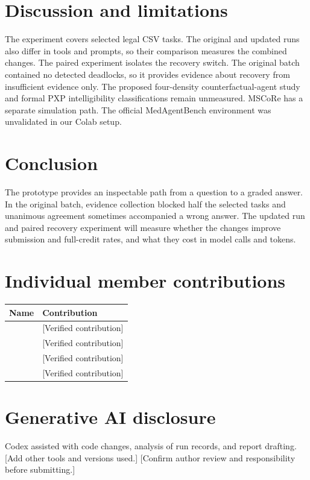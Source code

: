 \documentclass[11pt,a4paper,twocolumn]{article}
\begin{document}
\section{Discussion and limitations}
The experiment covers selected legal CSV tasks. The original and updated runs also differ in tools and prompts, so their comparison measures the combined changes. The paired experiment isolates the recovery switch. The original batch contained no detected deadlocks, so it provides evidence about recovery from insufficient evidence only. The proposed four-density counterfactual-agent study and formal PXP intelligibility classifications remain unmeasured. MSCoRe has a separate simulation path. The official MedAgentBench environment was unvalidated in our Colab setup.

\section{Conclusion}
The prototype provides an inspectable path from a question to a graded answer. In the original batch, evidence collection blocked half the selected tasks and unanimous agreement sometimes accompanied a wrong answer. The updated run and paired recovery experiment will measure whether the changes improve submission and full-credit rates, and what they cost in model calls and tokens.

\section*{Individual member contributions}
{\small
\begin{tabularx}{\linewidth}{@{}l X@{}}
\toprule
Name & Contribution \\
\midrule
[MEMBER 1] & [Verified contribution] \\
[MEMBER 2] & [Verified contribution] \\
[MEMBER 3] & [Verified contribution] \\
[MEMBER 4] & [Verified contribution] \\
\bottomrule
\end{tabularx}}

\section*{Generative AI disclosure}
Codex assisted with code changes, analysis of run records, and report drafting. [Add other tools and versions used.] [Confirm author review and responsibility before submitting.]
\end{document}
